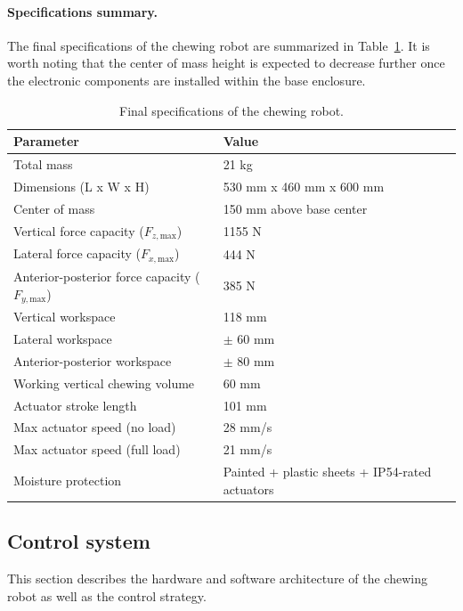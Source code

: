 \paragraph{Specifications summary.}The final specifications of the chewing robot are summarized in Table~\ref{tab:final_specs}. It is worth noting that 
the center of mass height is expected to decrease further once the electronic components are installed within the base enclosure.

\begin{table}[H]
\centering
\begin{tabular}{ l l }
\toprule
\textbf{Parameter} & \textbf{Value} \\
\midrule
Total mass & 21 kg \\
Dimensions (L x W x H) & 530 mm x 460 mm x 600 mm \\
Center of mass & 150 mm above base center \\
Vertical force capacity ($F_{z,\mathrm{max}}$) & 1155 N \\
Lateral force capacity ($F_{x,\mathrm{max}}$) & 444 N \\
Anterior-posterior force capacity ($F_{y,\mathrm{max}}$) & 385 N \\
Vertical workspace & 118 mm \\
Lateral workspace & $\pm$ 60 mm \\
Anterior-posterior workspace & $\pm$ 80 mm \\
Working vertical chewing volume & 60 mm \\
Actuator stroke length & 101 mm \\
Max actuator speed (no load) & 28 mm/s \\
Max actuator speed (full load) & 21 mm/s \\
Moisture protection & Painted + plastic sheets + IP54-rated actuators \\
\bottomrule
\end{tabular}
\caption{Final specifications of the chewing robot.}
\label{tab:final_specs}
\end{table}

\subsection{Control system}
\label{sec:control}

This section describes the hardware and software architecture of the chewing robot as well as the control strategy.

